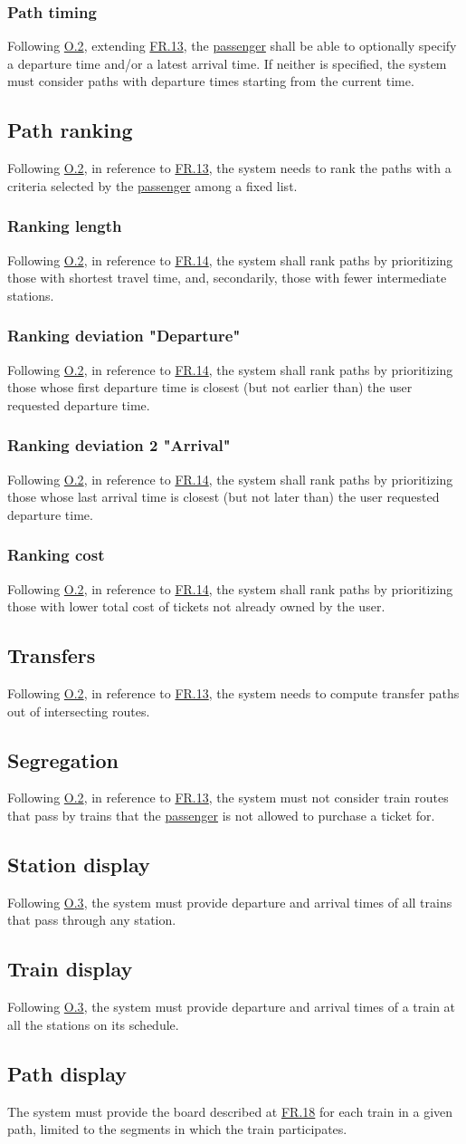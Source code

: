 \documentclass[12pt]{article}
\newcommand\un[1]{\underline{#1}}
\newcommand\hyl[1]{\hyperref[#1]{#1}}
\newcommand\subs[2]{\subsection{#1}\label{#2}}
\newcommand\ssubs[2]{\subsubsection{#1}\label{#2}}
\begin{document}
\ssubs{Path timing}{FR:13.2}
Following \hyl{O.2}, extending \hyl{FR.13}, the \un{passenger} shall be able to optionally specify a departure time and/or a latest 
arrival time. If neither is specified, the system must consider paths with departure times starting from the current time.

\subs{Path ranking}{FR.14}
Following \hyl{O.2}, in reference to \hyl{FR.13}, the system needs to rank the paths with a criteria selected by the \un{passenger} among a fixed list.

\ssubs{Ranking length}{FR.14.1}
Following \hyl{O.2}, in reference to \hyl{FR.14}, the system shall rank paths by prioritizing those with shortest travel time, and, secondarily, those with fewer intermediate stations.

\ssubs{Ranking deviation "Departure"}{FR.14.2}
Following \hyl{O.2}, in reference to \hyl{FR.14}, the system shall rank paths by prioritizing those whose first 
departure time is closest (but not earlier than) the user requested departure time.

\ssubs{Ranking deviation 2 "Arrival"}{FR.14.3}
Following \hyl{O.2}, in reference to \hyl{FR.14}, the system shall rank paths by prioritizing those whose last 
arrival time is closest (but not later than) the user requested departure time.

\ssubs{Ranking cost}{FR.14.4}
Following \hyl{O.2}, in reference to \hyl{FR.14}, the system shall rank paths by prioritizing those with lower total cost of 
tickets not already owned by the user.

\subs{Transfers}{FR.15}
Following \hyl{O.2}, in reference to \hyl{FR.13}, the system needs to compute transfer paths out of intersecting routes.

\subs{Segregation}{FR.16}
Following \hyl{O.2}, in reference to \hyl{FR.13}, the system must not consider train routes that pass by trains that the \un{passenger} is not allowed to purchase a ticket for.

\subs{Station display}{FR.17}
Following \hyl{O.3}, the system must provide departure and arrival times of all trains that pass through any station.

\subs{Train display}{FR.18}
Following \hyl{O.3}, the system must provide departure and arrival times of a train at all the stations on its schedule.

\subs{Path display}{FR.19}
The system must provide the board described at \hyl{FR.18} for each train in a given path, limited to the segments in which the train participates.
\end{document}
